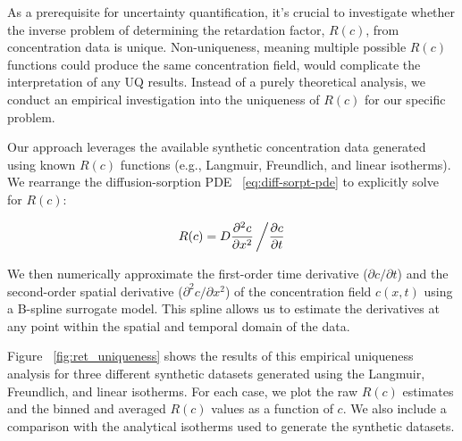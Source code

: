 As a prerequisite for uncertainty quantification, it's crucial to investigate whether the inverse problem of determining the retardation factor, $R(c)$, from concentration data is unique. Non-uniqueness, meaning multiple possible $R(c)$ functions could produce the same concentration field, would complicate the interpretation of any UQ results. Instead of a purely theoretical analysis, we conduct an empirical investigation into the uniqueness of $R(c)$ for our specific problem.

Our approach leverages the available synthetic concentration data generated using known $R(c)$ functions (e.g., Langmuir, Freundlich, and linear isotherms). We rearrange the diffusion-sorption PDE ~\vref{eq:diff-sorpt-pde} to explicitly solve for $R(c)$:

\begin{equation}
    R(c) = D \frac{\partial^2 c}{\partial x^2} \left/ \frac{\partial c}{\partial t} \right .
    \label{eq:rearranged_pde}
\end{equation}

We then numerically approximate the first-order time derivative ($\partial c / \partial t$) and the second-order spatial derivative ($\partial^2 c / \partial x^2$) of the concentration field $c(x,t)$ using a B-spline surrogate model. This spline allows us to estimate the derivatives at any point within the spatial and temporal domain of the data.

Figure ~\vref{fig:ret_uniqueness} shows the results of this empirical uniqueness analysis for three different synthetic datasets generated using the Langmuir, Freundlich, and linear isotherms. For each case, we plot the raw $R(c)$ estimates and the binned and averaged $R(c)$ values as a function of $c$. We also include a comparison with the analytical isotherms used to generate the synthetic datasets.

